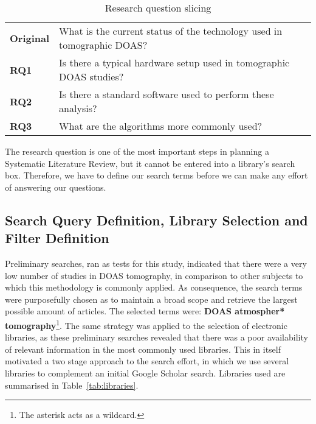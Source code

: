 \begin{table}[htb]
\centering
\small
\caption{Research question slicing}
\label{tab:rq_slicing}
    \begin{tabularx}{\textwidth}{lX}
        \toprule
        \textbf{Original} & What is the current status of the technology used in
        tomographic DOAS? \\
        \textbf{RQ1} & Is there a typical hardware setup used in tomographic
        DOAS studies? \\
        \textbf{RQ2} & Is there a standard software used to perform these
        analysis? \\
        \textbf{RQ3} & What are the algorithms more commonly used?\\\bottomrule
    \end{tabularx}
\end{table}

The research question is one of the most important steps in planning a
Systematic Literature Review, but it cannot be entered into a library's
search box. Therefore, we have to define our search terms before we can
make any effort of answering our questions.

\subsection{Search Query Definition, Library Selection and Filter Definition}
\label{sub:library_selection_and_filter_definition}

Preliminary searches, ran as tests for this study, indicated that there
were a very low number of studies in DOAS tomography, in comparison to
other subjects to which this methodology is commonly applied. As
consequence, the search terms were purposefully chosen as to maintain a
broad scope and retrieve the largest possible amount of articles. The
selected terms were: \textbf{DOAS atmospher* tomography}\footnote{The
asterisk acts as a wildcard.}. The same strategy was applied to the
selection of electronic libraries, as these preliminary searches
revealed that there was a poor availability of relevant information in
the most commonly used libraries. This in itself motivated a two stage
approach to the search effort, in which we use several libraries to
complement an initial Google Scholar search. Libraries used are
summarised in Table~\ref{tab:libraries}.

